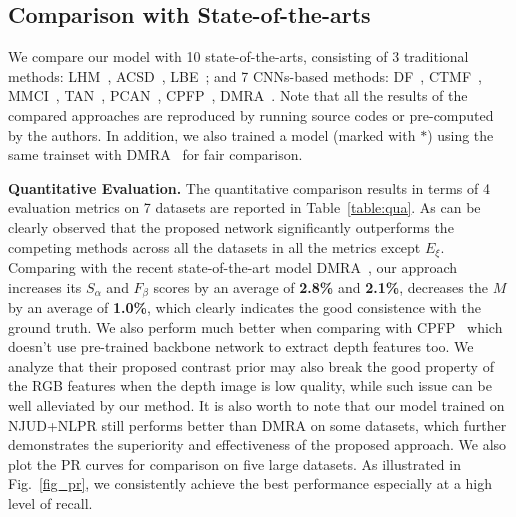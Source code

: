 \documentclass[runningheads]{llncs}
\begin{document}
\subsection{Comparison with State-of-the-arts}
We compare our model with 10 state-of-the-arts, consisting of 3 traditional methods: LHM~\cite{peng2014rgbd}, ACSD~\cite{ju2014depth}, LBE~\cite{feng2016local}; and 7 CNNs-based methods: DF~\cite{qu2017rgbd}, CTMF~\cite{han2017cnns}, MMCI~\cite{chen2019multi}, TAN~\cite{chen2019three}, PCAN~\cite{chen2018progressively}, CPFP~\cite{zhao2019contrast}, DMRA~\cite{piao2019depth}. Note that all the results of the compared approaches are reproduced by running source codes or pre-computed by the authors. In addition, we also trained a model (marked with $*$) using the same trainset with DMRA~\cite{piao2019depth} for fair comparison. 

\textbf{Quantitative Evaluation.} The quantitative comparison results in terms of 4 evaluation metrics on 7 datasets are reported in Table~\ref{table:qua}. As can be clearly observed that the proposed network significantly outperforms the competing methods across all the datasets in all the metrics except $E_{\xi}$. Comparing with the recent state-of-the-art model DMRA~\cite{piao2019depth}, our approach increases its $S_{\alpha}$ and $F_{\beta}$ scores by an average of \textbf{2.8\%} and \textbf{2.1\%}, decreases the $M$ by an average of \textbf{1.0\%}, which clearly indicates the good consistence with the ground truth. We also perform much better when comparing with CPFP~\cite{zhao2019contrast} which doesn't use pre-trained backbone network to extract depth features too. We analyze that their proposed contrast prior may also break the good property of the RGB features when the depth image is low quality, while such issue can be well alleviated by our method. It is also worth to note that our model trained on NJUD+NLPR still performs better than DMRA on some datasets, which further demonstrates the superiority and effectiveness of the proposed approach. We also plot the PR curves for comparison on five large datasets. As illustrated in Fig.~\ref{fig_pr}, we consistently achieve the best performance especially at a high level of recall.
\end{document}
